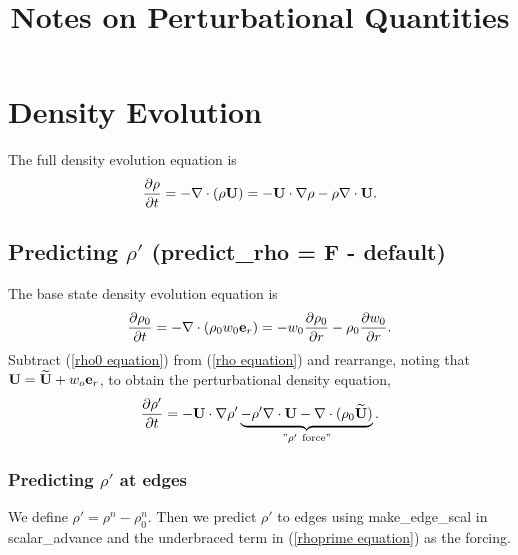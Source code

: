 \documentclass[11pt]{article}
\title{Notes on Perturbational Quantities}
\def\eb    {{\bf e}}
\def\Ub    {{\bf U}}
\def\Ubt   {\widetilde{\bf U}}
\begin{document}
\maketitle
\tableofcontents
\cleardoublepage

\section{Density Evolution}
The full density evolution equation is
\begin{equation}
\frac{\partial\rho}{\partial t} = -\nabla\cdot(\rho\Ub) = -\Ub\cdot\nabla\rho 
- \rho\nabla\cdot\Ub. \label{rho equation}
\end{equation}
\subsection{Predicting $\rho'$ (predict\_rho = F - default)}
The base state density evolution equation is
\begin{equation}
\frac{\partial\rho_0}{\partial t} = -\nabla\cdot(\rho_0 w_0 \eb_r) = 
-w_0\frac{\partial\rho_0}{\partial r} - \rho_0\frac{\partial w_0}{\partial r}.
\label{rho0 equation}
\end{equation}
Subtract (\ref{rho0 equation}) from (\ref{rho equation}) and rearrange, noting that 
$\Ub = \Ubt + w_o\eb_r$, to obtain the perturbational density equation,
\begin{equation}
\frac{\partial\rho'}{\partial t} = -\Ub\cdot\nabla\rho' \underbrace{- \rho'\nabla\cdot\Ub 
- \nabla\cdot(\rho_0\Ubt)}_{"\rho' ~ \text{force}"}. 
\label{rhoprime equation}
\end{equation}
\subsubsection{Predicting $\rho'$ at edges}
We define $\rho' = \rho^n - \rho_0^n$.  Then we predict $\rho'$ to edges using 
make\_edge\_scal in scalar\_advance and the underbraced term in (\ref{rhoprime equation}) 
as the forcing.
\end{document}
